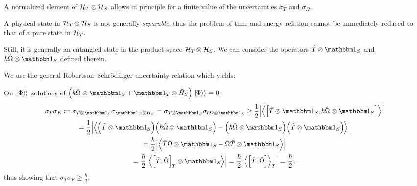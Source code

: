 A normalized element of $\mathcal{H}_T \otimes \mathcal{H}_S$ allows in principle for a finite value
of the uncertainties $\sigma_{T}$ and $\sigma_{\Omega}$.

A physical state in $\mathcal{H}_T \otimes \mathcal{H}_S$ is not generally
\emph{separable},
thus
the problem of time and energy relation cannot be immediately reduced to that of
a pure state in $\mathcal{H}_T$.

Still, it is generally an entangled state in the product space $\mathcal{H}_T \otimes \mathcal{H}_S$.
We can consider the
operators $\op{T} \ox \idop_{S}$ and $\hbar\op{\Omega} \ox \idop_{S}$
defined therein.

We use the general Robertson--Schr\"{o}dinger uncertainty relation which yields:

On $\left.\left| \Phi \right\rangle\right\rangle$ solutions of 
$\qty(\hbar\op{\Omega} \ox \idop_S + \idop_T \ox \op{H}_S) \dket{\Phi} = 0 \, \text{:}$%
\begin{multline}
  \sigma_T \sigma_E \eqbydef
  \sigma_{T \ox \idop_S} \sigma_{\idop_T \ox H_S}         =
  \sigma_{T \ox \idop_S} \sigma_{\hbar\Omega \ox \idop_S} \geq
  \frac{1}{2} \abs{\expval{\comm
    {\op{T}\ox\idop_S} {\hbar\op{\Omega}\ox\idop_S}
  }}
  \\
  = \frac{1}{2} \abs{\expval{
      \qty(\op{T}\ox\idop_S) \qty(\hbar\op{\Omega}\ox\idop_S) -
      \qty(\hbar\op{\Omega}\ox\idop_S) \qty(\op{T}\ox\idop_S)
    }}
  \\
  = \frac{\hbar}{2} \abs{\expval{
    \op{T}\op{\Omega}\ox\idop_S - \op{\Omega}\op{T}\ox\idop_S
  }}
  \\
  = \frac{\hbar}{2} \abs{\expval{
    \comm{\op{T}}{\op{\Omega}}_T \ox \idop_S
  }} =
  \frac{\hbar}{2} \abs{\expval{\comm
    {\op{T}}{\op{\Omega}}
  }_T} =
  \frac{\hbar}{2}
  \,\text{,}
\end{multline}
thus showing that $\sigma_T \sigma_E \geq \frac{\hbar}{2}$.




